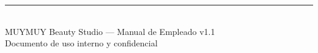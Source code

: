\documentclass[12pt,a4paper]{article}
\begin{document}
\vspace{2cm}
\begin{center}
  \textcolor{gris}{\rule{0.5\linewidth}{0.4pt}}\\[0.3cm]
  \textcolor{gris}{\small MUYMUY Beauty Studio --- Manual de Empleado v1.1}\\
  \textcolor{primario}{\small Documento de uso interno y confidencial}
\end{center}
\end{document}
